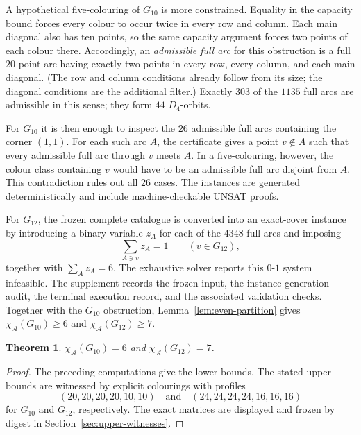\documentclass[11pt]{article}
\newtheorem{theorem}{Theorem}
\theoremstyle{definition}
\theoremstyle{remark}
\newcommand{\Dfour}{D_4}
\renewcommand{\ge}{\geqslant}
\begin{document}
A hypothetical five-colouring of \(G_{10}\) is more constrained.  Equality
in the capacity bound forces every colour to occur twice in every row and
column.  Each main diagonal also has ten points, so the same capacity argument
forces two points of each colour there.  Accordingly, an \emph{admissible
full arc} for this obstruction is a full \(20\)-point arc having exactly two
points in every row, every column, and each main diagonal.  (The row and
column conditions already follow from its size; the diagonal conditions are
the additional filter.)  Exactly \(303\) of the \(1135\) full arcs are
admissible in this sense; they form \(44\) \(\Dfour\)-orbits.

For \(G_{10}\) it is then enough to inspect the \(26\) admissible full arcs
containing the corner \((1,1)\).  For each such arc \(A\), the certificate
gives a point \(v\notin A\) such that every admissible full arc through \(v\) meets \(A\).
In a five-colouring, however, the colour class containing \(v\) would have
to be an admissible full arc disjoint from \(A\).  This contradiction rules
out all \(26\) cases.  The instances are generated deterministically and
include machine-checkable UNSAT proofs.

For \(G_{12}\), the frozen complete catalogue is converted into an
exact-cover instance \cite{Knuth2000} by introducing a binary variable \(z_A\) for each of the
\(4348\) full arcs and imposing
\begin{equation}\label{eq:exact-cover}
  \sum_{A\ni v} z_A = 1 \qquad (v\in G_{12}),
\end{equation}
together with \(\sum_A z_A=6\).  The exhaustive solver reports this
\(0\)-\(1\) system infeasible.  The supplement records the frozen input, the
instance-generation audit, the terminal execution record, and the associated
validation checks.  Together with the \(G_{10}\) obstruction,
Lemma~\ref{lem:even-partition} gives \(\chi_{\mathcal{A}}(G_{10})\ge6\) and \(\chi_{\mathcal{A}}(G_{12})\ge7\).

\begin{theorem}\label{thm:ten-twelve}
\(\chi_{\mathcal{A}}(G_{10})=6\) and \(\chi_{\mathcal{A}}(G_{12})=7\).
\end{theorem}

\begin{proof}
The preceding computations give the lower bounds.  The stated upper bounds
are witnessed by explicit colourings with profiles
\[
  (20,20,20,20,10,10) \quad\text{and}\quad
  (24,24,24,24,16,16,16)
\]
for \(G_{10}\) and \(G_{12}\), respectively.  The exact matrices are
displayed and frozen by digest in Section~\ref{sec:upper-witnesses}.
\end{proof}
\end{document}
